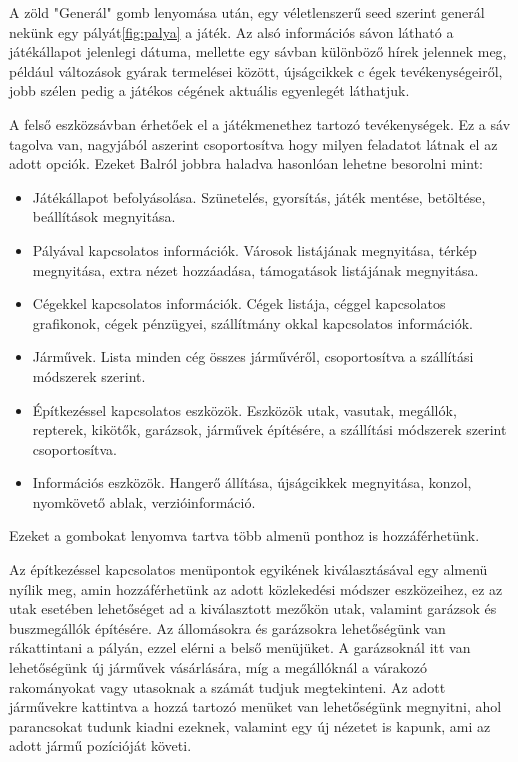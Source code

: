 A zöld "Generál" gomb lenyomása után, egy véletlenszerű seed szerint generál nekünk egy pályát\ref{fig:palya} a játék. Az alsó információs sávon látható a játékállapot jelenlegi dátuma, mellette egy sávban különböző hírek jelennek meg, például változások gyárak termelései között, újságcikkek c égek tevékenységeiről, jobb szélen pedig a játékos cégének aktuális egyenlegét láthatjuk.

A felső eszközsávban érhetőek el a játékmenethez tartozó tevékenységek. Ez a sáv tagolva van, nagyjából aszerint csoportosítva hogy milyen feladatot látnak el az adott opciók. Ezeket Balról jobbra haladva hasonlóan lehetne besorolni mint:

\begin{itemize}
	\item Játékállapot befolyásolása. Szünetelés, gyorsítás, játék mentése, betöltése, beállítások megnyitása.
	\item Pályával kapcsolatos információk. Városok listájának megnyitása, térkép megnyitása, extra nézet hozzáadása, támogatások listájának megnyitása.
	\item Cégekkel kapcsolatos információk. Cégek listája, céggel kapcsolatos grafikonok, cégek pénzügyei, szállítmány okkal kapcsolatos információk.
	\item Járművek. Lista minden cég összes járművéről, csoportosítva a szállítási módszerek szerint.
	\item Építkezéssel kapcsolatos eszközök. Eszközök utak, vasutak, megállók, repterek, kikötők, garázsok, járművek építésére, a szállítási módszerek szerint csoportosítva.
	\item Információs eszközök. Hangerő állítása, újságcikkek megnyitása, konzol, nyomkövető ablak, verzióinformáció.
\end{itemize}

Ezeket a gombokat lenyomva tartva több almenü ponthoz is hozzáférhetünk.

Az építkezéssel kapcsolatos menüpontok egyikének kiválasztásával egy almenü nyílik meg, amin hozzáférhetünk az adott közlekedési módszer eszközeihez, ez az utak esetében lehetőséget ad a kiválasztott mezőkön utak, valamint garázsok és buszmegállók építésére. Az állomásokra és garázsokra lehetőségünk van rákattintani a pályán, ezzel elérni a belső menüjüket. A garázsoknál itt van lehetőségünk új járművek vásárlására, míg a megállóknál a várakozó rakományokat vagy utasoknak a számát tudjuk megtekinteni. Az adott járművekre kattintva a hozzá tartozó menüket van lehetőségünk megnyitni, ahol parancsokat tudunk kiadni ezeknek, valamint egy új nézetet is kapunk, ami az adott jármű pozícióját követi.

